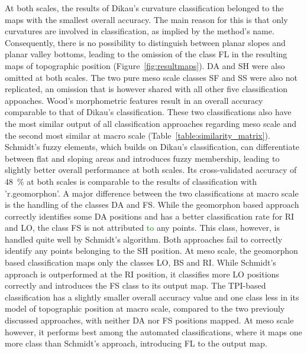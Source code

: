 \documentclass[preprint,12pt,authoryear]{elsarticle}
\begin{document}
At both scales, the results of Dikau's curvature classification belonged to the maps with the smallest overall accuracy. The main reason for this is that only curvatures are involved in classification, as implied by the method's name. Consequently, there is no possibility to distinguish between planar slopes and planar valley bottoms, leading to the omission of the class FL in the resulting maps of topographic position (Figure~\ref{fig:resultmaps}). DA and SH were also omitted at both scales. The two pure meso scale classes SF and SS were also not replicated, an omission that is however shared with all other five classification appoaches. Wood's morphometric features result in an overall accuracy comparable to that of Dikau's classification. These two classifications also have the most similar output of all classification approaches regarding meso scale and the second most similar at macro scale (Table~\ref{table:similarity_matrix}). Schmidt's fuzzy elements, which builds on Dikau's classification, can differentiate between flat and sloping areas and introduces fuzzy membership, leading to slightly better overall performance at both scales. Its cross-validated accuracy of 48~\% at both scales is comparable to the results of classification with 'r.geomorphon'.  A major difference between the two classifications at macro scale is the handling of the classes DA and FS. While the geomorphon based approach correctly identifies some DA positions and has a better classification rate for RI and LO, the class FS is not attributed \textcolor{green}{to} any points. This class, however, is handled quite well by Schmidt's algorithm. Both approaches fail to correctly identify any points belonging to the SH position. At meso scale, the geomorphon based classification maps only the classes LO, BS and RI. While Schmidt's approach is outperformed at the RI position, it classifies more LO positions correctly and introduces the FS class to its output map. The TPI-based classification has a slightly smaller overall accuracy value and one class less in its model of topographic position at macro scale, compared to the two previouly discussed approaches, with neither DA nor FS positions mapped. At meso scale however, it performs best among the automated classifications, where it maps one more class than Schmidt's approach, introducing FL to the output map. 
\end{document}
